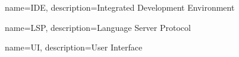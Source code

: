 {
	name=IDE,
	description={Integrated Development Environment}
}

{
	name=LSP,
	description={Language Server Protocol}
}

{
	name=UI,
	description={User Interface}
}



